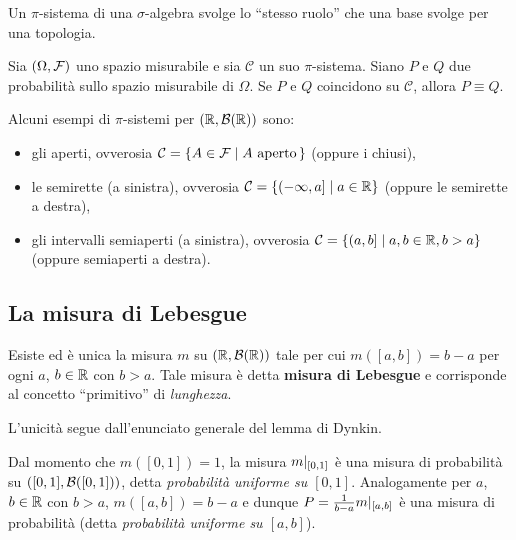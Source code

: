 \begin{multicols*}{2}
\begin{remark}
    Un $\pi$-sistema di una $\sigma$-algebra svolge lo ``stesso ruolo'' che una
    base svolge per una topologia.
\end{remark}

\begin{lemma}
    Sia $(\Omega, \mathcal{F})$ uno spazio misurabile e sia $\mathcal{C}$ un suo $\pi$-sistema. Siano
    $P$ e $Q$ due probabilità sullo spazio misurabile di $\Omega$. Se $P$ e $Q$ coincidono su
    $\mathcal{C}$, allora $P \equiv Q$.
\end{lemma}

\begin{example}
    Alcuni esempi di $\pi$-sistemi per $(\mathbb{R}, \mathcal{B}(\mathbb{R}))$ sono:
    \begin{itemize}
        \item gli aperti, ovverosia $\mathcal{C} = \{ A \in \mathcal{F} \mid A \text{ aperto}\, \}$ (oppure i chiusi),
        \item le semirette (a sinistra), ovverosia $\mathcal{C} = \{ (-\infty, a] \mid a \in \mathbb{R} \}$ (oppure le semirette a destra),
        \item gli intervalli semiaperti (a sinistra), ovverosia $\mathcal{C} = \{ (a, b] \mid a, b \in \mathbb{R}, b > a \}$ (oppure semiaperti a destra).
    \end{itemize}
\end{example}

\subsection{La misura di Lebesgue}

\begin{theorem}
    Esiste ed è unica la misura $m$ su $(\mathbb{R}, \mathcal{B}(\mathbb{R}))$ tale per cui
    $m([a, b]) = b-a$ per ogni $a$, $b \in \mathbb{R}$ con $b > a$. Tale misura
    è detta \textbf{misura di Lebesgue} e corrisponde al concetto ``primitivo'' di
    \textit{lunghezza}. \smallskip


    L'unicità segue dall'enunciato generale del lemma di Dynkin.
\end{theorem}

\begin{remark}
    Dal momento che $m([0, 1]) = 1$,
    la misura $m\arrowvert_{[0,1]}$ è una misura di probabilità su $([0,1], \mathcal{B}([0, 1]))$,
    detta \textit{probabilità uniforme su $[0,1]$}. Analogamente per $a$, $b \in \mathbb{R}$
    con $b > a$, $m([a, b]) = b-a$ e
    dunque $P = \frac{1}{b-a} m\arrowvert_{[a,b]}$ è una misura di probabilità (detta
    \textit{probabilità uniforme su $[a,b]$}). \smallskip



\end{remark}
\end{multicols*}
